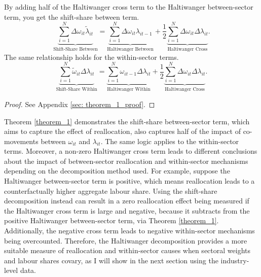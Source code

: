 \begin{theorem}
\label{theorem_1}
By adding half of the Haltiwanger cross term to the Haltiwanger between-sector term, you get the shift-share between term.
\begin{equation*}
    \underbrace{\sum_{i=1}^{N}\Delta \omega_{it} \tilde{\lambda}_{it}}_\text{Shift-Share Between} = \underbrace{\sum_{i=1}^{N}\Delta  \omega_{it} \lambda_{it-1}}_\text{Haltiwanger Between} + \frac{1}{2}\underbrace{\sum_{i=1}^{N}\Delta \omega_{it} \Delta \lambda_{it}}_\text{Haltiwanger Cross}.
\end{equation*}
The same relationship holds for the within-sector terms.
\begin{equation*}
    \underbrace{\sum_{i=1}^{N}\tilde{\omega}_{it}\Delta \lambda_{it}}_\text{Shift-Share Within} = \underbrace{\sum_{i=1}^{N}\omega_{it-1}\Delta \lambda_{it}}_\text{Haltiwanger Within} + \frac{1}{2}\underbrace{\sum_{i=1}^{N}\Delta \omega_{it} \Delta \lambda_{it}}_\text{Haltiwanger Cross}.     
\end{equation*}
\end{theorem}
\begin{proof}
    See Appendix \ref{sec: theorem_1_proof}.
\end{proof}
\noindent Theorem \ref{theorem_1} demonstrates the shift-share between-sector term, which aims to capture the effect of reallocation, also captures half of the impact of co-movements between $\omega_{it}$ and $\lambda_{it}$. The same logic applies to the within-sector terms. Moreover, a non-zero Haltiwanger cross term leads to different conclusions about the impact of between-sector reallocation and within-sector mechanisms depending on the decomposition method used. For example, suppose the Haltiwanger between-sector term is positive, which means reallocation leads to a counterfactually higher aggregate labour share. Using the shift-share decomposition instead can result in a zero reallocation effect being measured if the Haltiwanger cross term is large and negative, because it subtracts from the positive Haltiwanger between-sector term, via Theorem \ref{theorem_1}. Additionally, the negative cross term leads to negative within-sector mechanisms being overcounted. Therefore, the Haltiwanger decomposition provides a more suitable measure of reallocation and within-sector causes when sectoral weights and labour shares covary, as I will show in the next section using the industry-level data.



